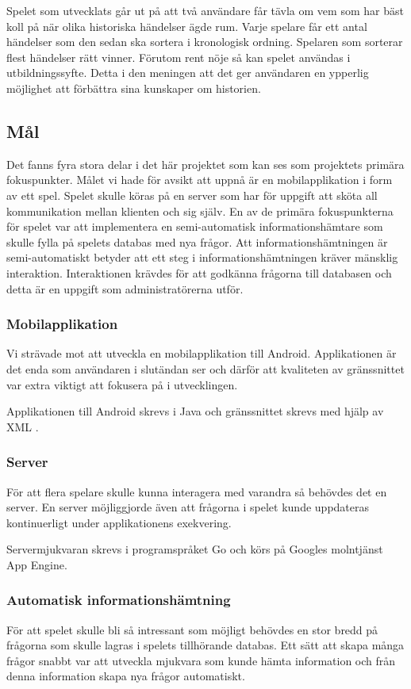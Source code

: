 \documentclass[a4paper, 11pt]{article}
\begin{document}
Spelet som utvecklats går ut på att två användare får tävla om vem som har bäst koll på när olika historiska händelser ägde rum. Varje spelare får ett antal händelser som den sedan ska sortera i kronologisk ordning. Spelaren som sorterar flest händelser rätt vinner. Förutom rent nöje så kan spelet användas i utbildningssyfte. Detta i den meningen att det ger användaren en ypperlig möjlighet att förbättra sina kunskaper om historien.

\subsection{Mål}
Det fanns fyra stora delar i det här projektet som kan ses som projektets primära fokuspunkter. Målet vi hade för avsikt att uppnå är en mobilapplikation i form av ett spel. Spelet skulle köras på en server som har för uppgift att sköta all kommunikation mellan klienten och sig själv. En av de primära fokuspunkterna för spelet var att implementera en semi-automatisk informationshämtare som skulle fylla på spelets databas med nya frågor. Att informationshämtningen är semi-automatiskt betyder att ett steg i informationshämtningen kräver mänsklig interaktion. Interaktionen krävdes för att godkänna frågorna till databasen och detta är en uppgift som administratörerna utför. 


\subsubsection{Mobilapplikation}
Vi strävade mot att utveckla en mobilapplikation till Android. Applikationen är det enda som användaren i slutändan ser och därför att kvaliteten av gränssnittet var extra viktigt att fokusera på i utvecklingen. 

Applikationen till Android skrevs i Java och gränssnittet skrevs med hjälp av XML \cite{xml}. 

\subsubsection{Server}
För att flera spelare skulle kunna interagera med varandra så behövdes det en server. En server möjliggjorde även att frågorna i spelet kunde uppdateras kontinuerligt under applikationens exekvering.

Servermjukvaran skrevs i programspråket Go \cite{golang} och körs på Googles molntjänst App Engine.

\subsubsection{Automatisk informationshämtning}
För att spelet skulle bli så intressant som möjligt behövdes en stor bredd på frågorna som skulle lagras i spelets tillhörande databas. Ett sätt att skapa många frågor snabbt var att utveckla mjukvara som kunde hämta information och från denna information skapa nya frågor automatiskt. 
\end{document}
